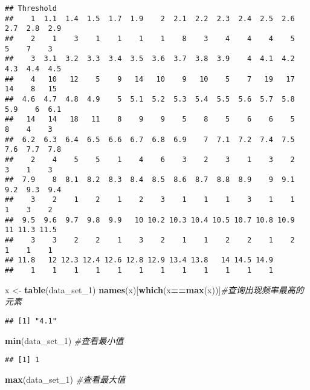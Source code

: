 \documentclass[
]{book}
\newenvironment{Shaded}{\begin{snugshade}}{\end{snugshade}}
\newcommand{\CommentTok}[1]{\textcolor[rgb]{0.56,0.35,0.01}{\textit{#1}}}
\newcommand{\FunctionTok}[1]{\textcolor[rgb]{0.13,0.29,0.53}{\textbf{#1}}}
\newcommand{\NormalTok}[1]{#1}
\newcommand{\OtherTok}[1]{\textcolor[rgb]{0.56,0.35,0.01}{#1}}
\newcommand{\SpecialCharTok}[1]{\textcolor[rgb]{0.81,0.36,0.00}{\textbf{#1}}}
\theoremstyle{definition}
\theoremstyle{definition}
\theoremstyle{definition}
\theoremstyle{definition}
\theoremstyle{remark}
\begin{document}
\begin{verbatim}
## Threshold
##    1  1.1  1.4  1.5  1.7  1.9    2  2.1  2.2  2.3  2.4  2.5  2.6  2.7  2.8  2.9 
##    2    1    3    1    1    1    1    8    3    4    4    4    5    5    7    3 
##    3  3.1  3.2  3.3  3.4  3.5  3.6  3.7  3.8  3.9    4  4.1  4.2  4.3  4.4  4.5 
##    4   10   12    5    9   14   10    9   10    5    7   19   17   14    8   15 
##  4.6  4.7  4.8  4.9    5  5.1  5.2  5.3  5.4  5.5  5.6  5.7  5.8  5.9    6  6.1 
##   14   14   18   11    8    9    9    5    8    5    6    6    5    8    4    3 
##  6.2  6.3  6.4  6.5  6.6  6.7  6.8  6.9    7  7.1  7.2  7.4  7.5  7.6  7.7  7.8 
##    2    4    5    5    1    4    6    3    2    3    1    3    2    3    1    3 
##  7.9    8  8.1  8.2  8.3  8.4  8.5  8.6  8.7  8.8  8.9    9  9.1  9.2  9.3  9.4 
##    3    2    1    2    1    2    3    1    1    1    3    1    1    1    3    2 
##  9.5  9.6  9.7  9.8  9.9   10 10.2 10.3 10.4 10.5 10.7 10.8 10.9   11 11.3 11.5 
##    3    3    2    2    1    3    2    1    1    2    2    1    2    1    1    1 
## 11.8   12 12.3 12.4 12.6 12.8 12.9 13.4 13.8   14 14.5 14.9 
##    1    1    1    1    1    1    1    1    1    1    1    1
\end{verbatim}

\begin{Shaded}
\begin{Highlighting}[]
\NormalTok{x }\OtherTok{\textless{}{-}} \FunctionTok{table}\NormalTok{(data\_set\_1)}
\FunctionTok{names}\NormalTok{(x)[}\FunctionTok{which}\NormalTok{(x}\SpecialCharTok{==}\FunctionTok{max}\NormalTok{(x))]}\CommentTok{\#查询出现频率最高的元素}
\end{Highlighting}
\end{Shaded}

\begin{verbatim}
## [1] "4.1"
\end{verbatim}

\begin{Shaded}
\begin{Highlighting}[]
\FunctionTok{min}\NormalTok{(data\_set\_1) }\CommentTok{\#查看最小值}
\end{Highlighting}
\end{Shaded}

\begin{verbatim}
## [1] 1
\end{verbatim}

\begin{Shaded}
\begin{Highlighting}[]
\FunctionTok{max}\NormalTok{(data\_set\_1) }\CommentTok{\#查看最大值}
\end{Highlighting}
\end{Shaded}
\end{document}
